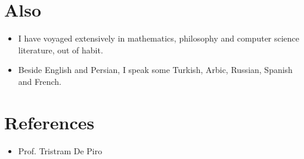 \documentclass[11pt,a4paper,sans]{moderncv}        %
\begin{document}
\section{Also}
\vspace{6pt}

\begin{itemize}

\item{I have voyaged extensively in mathematics, philosophy and computer science literature, out of habit.}
\item Beside English and Persian, I speak some Turkish, Arbic, Russian, Spanish and French. 

\vspace{6pt}

\end{itemize}

\section{References}

\vspace{6pt}
 
\begin{itemize}

\item{Prof. Tristram De Piro}

\end{itemize}

\nocite{*}



\end{document}
